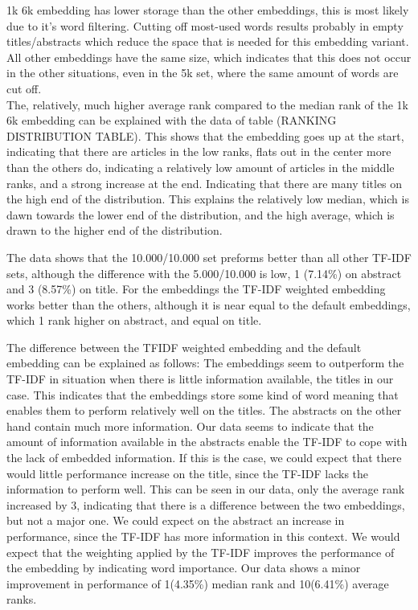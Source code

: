 \documentclass[../../Thesis.tex]{subfiles}
\begin{document}
1k 6k embedding has lower storage than the other embeddings, this is most likely due to it's word filtering. Cutting off most-used words results probably in empty titles/abstracts which reduce the space that is needed for this embedding variant. All other embeddings have the same size, which indicates that this does not occur in the other situations, even in the 5k set, where the same amount of words are cut off.\\
The, relatively, much higher average rank compared to the median rank of the 1k 6k embedding can be explained with the data of table (RANKING DISTRIBUTION TABLE). This shows that the embedding goes up at the start, indicating that there are articles in the low ranks, flats out in the center more than the others do, indicating a relatively low amount of articles in the middle ranks, and a strong increase at the end. Indicating that there are  many titles on the high end of the distribution. This explains the relatively low median, which is dawn towards the lower end of the distribution, and the high average, which is drawn to the higher end of the distribution.

The data shows that the 10.000/10.000 set preforms better than all other TF-IDF sets, although the difference with the 5.000/10.000 is low, 1 (7.14\%) on abstract and 3 (8.57\%) on title. For the embeddings the TF-IDF weighted embedding works better than the others, although it is near equal to the default embeddings, which 1 rank higher on abstract, and equal on title.

The difference between the TFIDF weighted embedding and the default embedding can be explained as follows:
The embeddings seem to outperform the TF-IDF in situation when there is little information available, the titles in our case. This indicates that the embeddings store some kind of word meaning that enables them to perform relatively well on the titles. The abstracts on the other hand contain much more information. Our data seems to indicate that the amount of information available in the abstracts enable the TF-IDF to cope with the lack of embedded information. If this is the case, we could expect that there would little performance increase on the title, since the TF-IDF lacks the information to perform well. This can be seen in our data, only the average rank increased by 3, indicating that there is a difference between the two embeddings, but not a major one. We could expect on the abstract an increase in performance, since the TF-IDF has more information in this context. We would expect that the weighting applied by the TF-IDF improves the performance of the embedding by indicating word importance. Our data shows a minor improvement in performance of 1(4.35\%) median rank and 10(6.41\%) average ranks.
\end{document}
